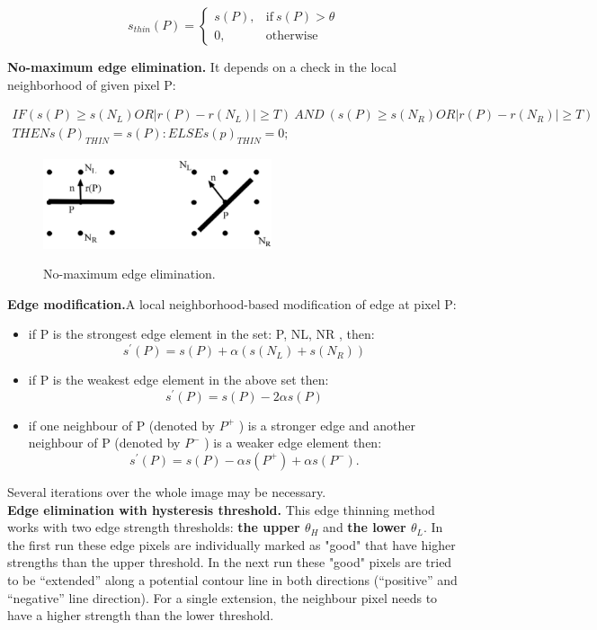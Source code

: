 \documentclass[letterpaper,12pt]{article}
\begin{document}
\begin{equation}
s_{thin}(P) = \begin{cases}
	s(P), & \text{if}\ s(P) > \theta	\\
	0, & \text{otherwise}
\end{cases}
\label{ncc}
\end{equation}

\textbf{No-maximum edge elimination.} It depends on a check in the local neighborhood of given pixel P:

\begin{gather}
	IF(s(P)\geq s(N_L) OR |r(P)-r(N_L)|\geq T)\
	AND\ (s(P)\geq s(N_R)OR |r(P)-r(N_R)|\geq T)\\
	THEN s(P)_{THIN}=s(P):
	ELSE s(p)_{THIN}=0;
\end{gather}

\begin{figure}[!th]
  \centering
  {\includegraphics[width=0.6\textwidth]{edge_thin_neghb}\label{fig:edge_thin_n}}
    \caption{No-maximum edge elimination.}
  \end{figure}


\textbf{Edge modification.}A local neighborhood-based modification of edge at pixel P:
\begin{itemize}
	\item if P is the strongest edge element in the set: P, NL, NR , then:
\[ s^{'} (P)=s(P)+ \alpha(s(N_L)+s(N_R ))\]
	\item if P is the weakest edge element in the above set then:
\[s^{'}(P) = s(P) - 2 \alpha s(P) \]
	\item if one neighbour of P (denoted by $P^+$ ) is a stronger edge and another neighbour of P (denoted by $P^-$ ) is a weaker edge element then:
\[s^{'}(P) = s(P) - \alpha s(P^+) + \alpha s(P^-).\]
\end{itemize}

Several iterations over the whole image may be necessary.\\

\textbf{Edge elimination with hysteresis threshold.} This edge thinning method works with two edge strength thresholds: \textbf{the upper $\theta_H$} and \textbf{the lower $\theta_L$}.
In the first run these edge pixels are individually marked as "good" that have higher strengths than the upper threshold.
In the next run these "good" pixels are tried to be “extended” along a potential contour line in both directions (“positive” and “negative” line direction). For a single extension, the neighbour pixel needs to have a higher strength than the lower threshold.
\end{document}

